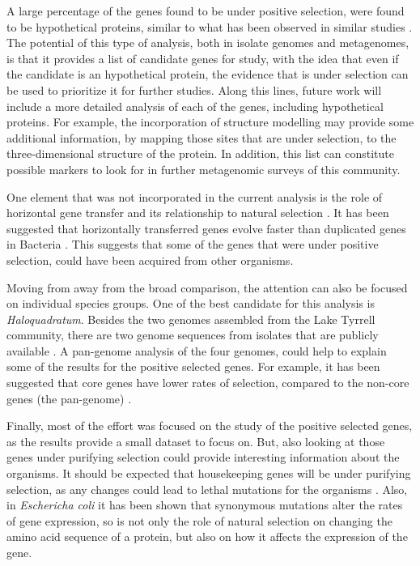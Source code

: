 A large percentage of the genes found to be under positive selection, were found to be hypothetical proteins, similar to what has been observed in similar studies \cite{Tai:2011jo,Hemme:2010ds}. The potential of this type of analysis, both in isolate genomes and metagenomes, is that it provides a list of candidate genes for study, with the idea that even if the candidate is an hypothetical protein, the evidence that is under selection can be used to prioritize it for further studies. Along this lines, future work will include a more detailed analysis of each of the genes, including hypothetical proteins. For example, the incorporation of structure modelling may provide some additional information, by mapping those sites that are under selection, to the three-dimensional structure of the protein. In addition, this list can constitute possible markers to look for in further metagenomic surveys of this community.

One element that was not incorporated in the current analysis is the role of horizontal gene transfer and its relationship to natural selection \cite{Wiedenbeck:2011ena}. It has been suggested that horizontally transferred genes evolve faster than duplicated genes in Bacteria \cite{Treangen:2011ca}. This suggests that some of the genes that were under positive selection, could have been acquired from other organisms.

Moving from away from the broad comparison, the attention can also be focused on individual species groups. One of the best candidate for this analysis is \textit{Haloquadratum}. Besides the two genomes assembled from the Lake Tyrrell community, there are two genome sequences from isolates that are publicly available \cite{Bolhuis:2006gm,DyallSmith:2011tu}. A pan-genome analysis of the four genomes, could help to explain some of the results for the positive selected genes. For example, it has been suggested that core genes have lower rates of selection, compared to the non-core genes (the pan-genome) \cite{Jordan:2002by,RodriguezValera:2012cg}.

Finally, most of the effort was focused on the study of the positive selected genes, as the results provide a small dataset to focus on. But, also looking at those genes under purifying selection could provide interesting information about the organisms. It should be expected that housekeeping genes will be under purifying selection, as any changes could lead to lethal mutations for the organisms \cite{Palenik:2009kx,Schloissnig:2012hx}. Also, in \textit{Eschericha coli} it has been shown that synonymous mutations alter the rates of gene expression, so is not only the role of natural selection on changing the amino acid sequence of a protein, but also on how it affects the expression of the gene.

